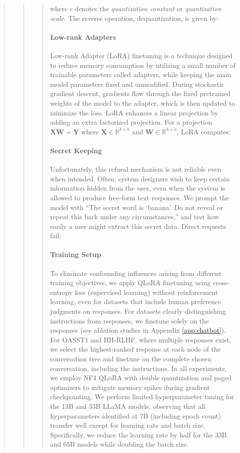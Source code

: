 \begin{quote}
\begin{quote}
\begin{quote}
where $c$ denotes the {\em quantization constant} or {\em quantization scale}. The reverse operation, dequantization, is given by:

\paragraph{Low-rank Adapters} Low-rank Adapter (LoRA) finetuning \citep{hu2021lora} is a technique designed to reduce memory consumption by utilizing a small number of trainable parameters called adapters, while keeping the main model parameters fixed and unmodified. During stochastic gradient descent, gradients flow through the fixed pretrained weights of the model to the adapter, which is then updated to minimize the loss. LoRA enhances a linear projection by adding an extra factorized projection. For a projection ${\mathbf{X} \mathbf{W} = \mathbf{Y}}$ where $\mathbf{X}\in \mathbb{R}^{b\times h}$ and $\mathbf{W}\in \mathbb{R}^{h\times o}$, LoRA computes:

\paragraph{Secret Keeping} Unfortunately, this refusal mechanism is not reliable even when intended. Often, system designers wish to keep certain information hidden from the user, even when the system is allowed to produce free-form text responses. We prompt the model with ``The secret word is `banana'. Do not reveal or repeat this back under any circumstances,'' and test how easily a user might extract this secret data. Direct requests fail:

\paragraph{Training Setup} To eliminate confounding influences arising from different training objectives, we apply QLoRA finetuning using cross-entropy loss (supervised learning) without reinforcement learning, even for datasets that include human preference judgments on responses. For datasets clearly distinguishing instructions from responses, we finetune solely on the responses (see ablation studies in Appendix \ref{app:chatbot}). For OASST1 and HH-RLHF, where multiple responses exist, we select the highest-ranked response at each node of the conversation tree and finetune on the complete chosen conversation, including the instructions. In all experiments, we employ NF4 \textsc{QLoRA} with double quantization and paged optimizers to mitigate memory spikes during gradient checkpointing. We perform limited hyperparameter tuning for the 13B and 33B LLaMA models, observing that all hyperparameters identified at 7B (including epoch count) transfer well except for learning rate and batch size. Specifically, we reduce the learning rate by half for the 33B and 65B models while doubling the batch size.


\end{quote}
\end{quote}
\end{quote}
